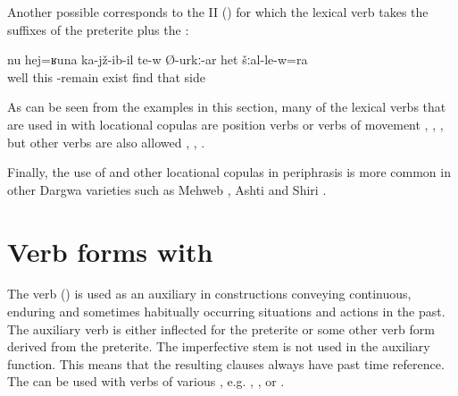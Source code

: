 Another possible  corresponds to the  II () for which the lexical verb takes the suffixes of the preterite plus the  :
%
\begin{exe}
	\ex	\label{ex:‎Well, he is like sitting, probably, at the side (of the road)}
	\gll	nu	hej=ʁuna	ka-jž-ib-il	te-w	Ø-urkː-ar	het	šːal-le-w=ra\\
		well	this	-remain	exist	find	that	side\\
	\glt	{}
\end{exe}

As can be seen from the examples in this section, many of the lexical verbs that are used in  with locational copulas are position verbs or verbs of movement , , , but other verbs are also allowed , , .

Finally, the use of  and other locational copulas in periphrasis is more common in other Dargwa varieties such as Mehweb \citep{Daniel2015}, Ashti \citep{Belyaev2012} and Shiri \citep{BelyaevInPreparation}.



\section{Verb forms with \protect{} \protect{}}
\label{sec:Verb forms with kelgw- remain}

The verb  ()  is used as an auxiliary in constructions conveying continuous, enduring and sometimes habitually occurring situations and actions in the past. The auxiliary verb is either inflected for the preterite  or some other verb form derived from the preterite. The imperfective stem  is not used in the auxiliary function. This means that the resulting clauses always have  past time reference. The  can be used with verbs of various , e.g.  ,  , or  . 

